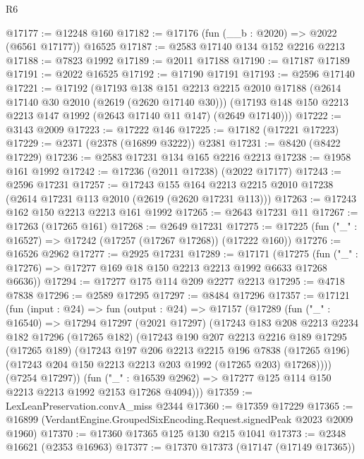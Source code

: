 \begin{lexlean}{R6}
\begin{coremodule}
@17177 := @12248 @160
@17182 := @17176 (fun (__b : @2020) => @2022 (@6561 @17177)) @16525
@17187 := @2583 @17140 @134 @152 @2216 @2213
@17188 := @7823 @1992
@17189 := @2011 @17188
@17190 := @17187 @17189
@17191 := @2022 @16525
@17192 := @17190 @17191
@17193 := @2596 @17140
@17221 := @17192
    (@17193
      @138
      @151
      @2213
      @2215
      @2010
      @17188
      (@2614 @17140 @30 @2010 (@2619 (@2620 @17140 @30)))
      (@17193 @148 @150 @2213 @2213 @147 @1992 (@2643 @17140 @11 @147) (@2649 @17140)))
@17222 := @3143 @2009
@17223 := @17222 @146
@17225 := @17182 (@17221 @17223)
@17229 := @2371 (@2378 (@16899 @3222)) @2381
@17231 := @8420 (@8422 @17229)
@17236 := @2583 @17231 @134 @165 @2216 @2213
@17238 := @1958 @161 @1992
@17242 := @17236 (@2011 @17238) (@2022 @17177)
@17243 := @2596 @17231
@17257 := @17243
    @155
    @164
    @2213
    @2215
    @2010
    @17238
    (@2614 @17231 @113 @2010 (@2619 (@2620 @17231 @113)))
@17263 := @17243 @162 @150 @2213 @2213 @161 @1992
@17265 := @2643 @17231 @11
@17267 := @17263 (@17265 @161)
@17268 := @2649 @17231
@17275 := @17225 (fun ("_" : @16527) => @17242 (@17257 (@17267 @17268)) (@17222 @160))
@17276 := @16526 @2962
@17277 := @2925 @17231
@17289 := @17171
    (@17275 (fun ("_" : @17276) => @17277 @169 @18 @150 @2213 @2213 @1992 @6633 @17268 @6636))
@17294 := @17277 @175 @114 @209 @2277 @2213
@17295 := @4718 @7838
@17296 := @2589 @17295
@17297 := @8484 @17296
@17357 := @17121
    (fun (input : @24) =>
    fun (output : @24) =>
    @17157
      (@17289
        (fun ("_" : @16540) =>
        @17294
          @17297
          (@2021 @17297)
          (@17243
            @183
            @208
            @2213
            @2234
            @182
            @17296
            (@17265 @182)
            (@17243
              @190
              @207
              @2213
              @2216
              @189
              @17295
              (@17265 @189)
              (@17243
                @197
                @206
                @2213
                @2215
                @196
                @7838
                (@17265 @196)
                (@17243 @204 @150 @2213 @2213 @203 @1992 (@17265 @203) @17268))))
          (@7254 @17297))
        (fun ("_" : @16539 @2962) => @17277 @125 @114 @150 @2213 @2213 @1992 @2153 @17268 @4094)))
@17359 := LexLeanPreservation.convA_miss @2344
@17360 := @17359 @17229
@17365 := @16899 (VerdantEngine.GroupedSixEncoding.Request.signedPeak @2023 @2009 @1960)
@17370 := @17360 @17365 @125 @130 @215 @1041
@17373 := @2348 @16621 (@2353 @16963)
@17377 := @17370 @17373 (@17147 (@17149 @17365))

\end{coremodule}
\end{lexlean}
